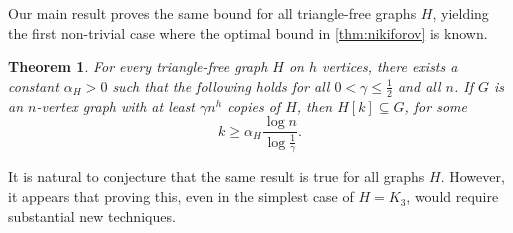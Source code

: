 \documentclass{aic}
\theoremstyle{plain}
\newtheorem{theorem}{Theorem}[section]
\theoremstyle{remark}
\begin{document}
Our main result proves the same bound for all triangle-free graphs $H$, yielding the first non-trivial case where the optimal bound in \cref{thm:nikiforov} is known.
\begin{theorem}\label{thm:main}
    For every triangle-free graph $H$ on $h$ vertices, there exists a constant $\alpha_H>0$ such that the following holds for all $0<\gamma\leq \frac 12$ and all $n$. If $G$ is an $n$-vertex graph with at least $\gamma n^h$ copies of $H$, then $H[k] \subseteq G$, for some
    \[
        k \geq \alpha_H \frac{\log n}{\log \frac 1 \gamma}.
    \]
\end{theorem}
It is natural to conjecture that the same result is true for all graphs $H$. However, it appears that proving this, even in the simplest case of $H=K_3$, would require substantial new techniques. 
\end{document}
